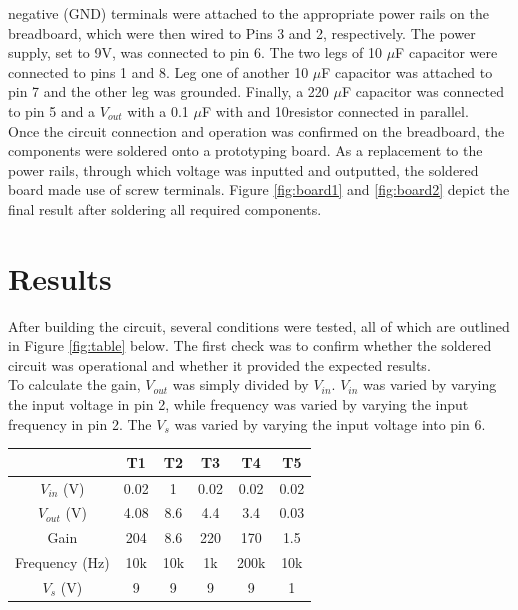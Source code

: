 \documentclass[journal]{IEEEtran}
\begin{document}
 \noindent negative (GND) terminals were attached to the appropriate power rails on the breadboard, which were then wired to Pins 3 and 2, respectively. The power supply, set to 9V, was connected to pin 6. The two legs of 10 $\mu$F capacitor were connected to pins 1 and 8. Leg one of another 10 $\mu$F capacitor was attached to pin 7 and the other leg was grounded. Finally, a 220 $\mu$F capacitor was connected to pin 5 and a $V_{out}$ with a 0.1 $\mu$F with and 10\ohm resistor connected in parallel. \\

\noindent Once the circuit connection and operation was confirmed on the breadboard, the components were soldered onto a prototyping board. As a replacement to the power rails, through which voltage was inputted and outputted, the soldered board made use of screw terminals. Figure \ref{fig:board1} and \ref{fig:board2} depict the final result after soldering all required components.\\

\section{Results}

\noindent After building the circuit, several conditions were tested, all of which are outlined in Figure \ref{fig:table} below. The first check was to confirm whether the soldered circuit was operational and whether it provided the expected results.\\

\noindent To calculate the gain, $ V_{out}$ was simply divided by $V_{in}$. $V_{in}$ was varied by varying the input voltage  in pin 2, while frequency was varied by varying the input frequency in pin 2. The $V_{s}$ was varied by varying the input voltage into pin 6.\\


\begingroup
    \medskip
\centering
\def\arraystretch{1.5}
\begin{tabular}{cccccc}
\toprule
& T1 & T2 & T3 & T4 & T5 \\
\midrule
$V_{in}$ (V) & 0.02 & 1 & 0.02 & 0.02 & 0.02 \\
$V_{out}$ (V) & 4.08 & 8.6 & 4.4 & 3.4 & 0.03 \\
Gain & 204 & 8.6 & 220 & 170 & 1.5 \\
Frequency (Hz) & 10k & 10k & 1k & 200k & 10k \\
$V_{s}$ (V) & 9 & 9 & 9 & 9 & 1 \\
\bottomrule
\end{tabular}
\label{fig:table}
    \medskip
\endgroup
\end{document}
